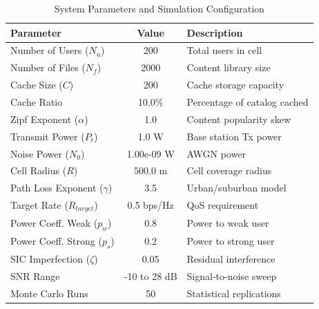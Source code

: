 \begin{table}[h]
\centering
\caption{System Parameters and Simulation Configuration}
\label{tab:system_params}
\begin{tabular}{|l|c|l|}
\hline
\textbf{Parameter} & \textbf{Value} & \textbf{Description} \\
\hline
Number of Users ($N_u$) & 200 & Total users in cell \\
Number of Files ($N_f$) & 2000 & Content library size \\
Cache Size ($C$) & 200 & Cache storage capacity \\
Cache Ratio & 10.0\% & Percentage of catalog cached \\
Zipf Exponent ($\alpha$) & 1.0 & Content popularity skew \\
\hline
Transmit Power ($P_t$) & 1.0 W & Base station Tx power \\
Noise Power ($N_0$) & 1.00e-09 W & AWGN power \\
Cell Radius ($R$) & 500.0 m & Cell coverage radius \\
Path Loss Exponent ($\gamma$) & 3.5 & Urban/suburban model \\
\hline
Target Rate ($R_{target}$) & 0.5 bps/Hz & QoS requirement \\
Power Coeff. Weak ($p_w$) & 0.8 & Power to weak user \\
Power Coeff. Strong ($p_s$) & 0.2 & Power to strong user \\
SIC Imperfection ($\zeta$) & 0.05 & Residual interference \\
\hline
SNR Range & -10 to 28 dB & Signal-to-noise sweep \\
Monte Carlo Runs & 50 & Statistical replications \\
\hline
\end{tabular}
\end{table}
